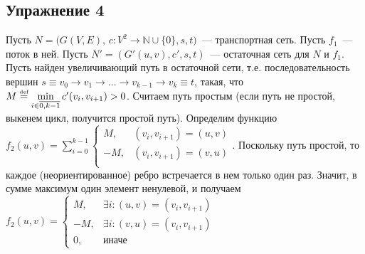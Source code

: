 \documentclass[a4paper]{article}
\def\eqdef{\overset{\mbox{\tiny def}}{=}}
\newcommand{\Nz}{\mathbb{N}\cup\{0\}}
\begin{document}
\subsection*{Упражнение 4}
Пусть $N=(G(V,E)$, $c\colon V^2\to\Nz, s, t)$~--- транспортная сеть. Пусть $f_1$~--- поток в ней. Пусть $N'=(G'(u,v), c',s,t)$~--- остаточная сеть для $N$ и $f_1$. Пусть найден увеличивающий путь в остаточной сети, т.е. последовательность вершин $s\equiv v_0\to v_1\to ...\to v_{k-1}\to v_k\equiv t$, такая, что
$M\eqdef \min\limits_{i\in\overline{0,k-1}}c'(v_i,v_{i+1})>0$. Считаем путь простым (если путь не простой, выкенем цикл, получится простой путь). Определим функцию $f_2(u,v)=\sum\limits_{i=0}^{k-1}\left\{\begin{array}{rc}
 M, & (v_i,v_{i+1})=(u,v)\\
-M, & (v_i,v_{i+1})=(v,u)\\
\end{array}\right.$. Поскольку путь простой, то каждое (неориентированное) ребро встречается в нем только один раз. Значит, в сумме максимум один элемент ненулевой, и получаем $f_2(u,v)=\left\{\begin{array}{rl}
M, & \exists i\colon (u,v)=(v_i,v_{i+1})\\
-M, & \exists i\colon (v,u)=(v_i,v_{i+1})\\
0, & \mbox{иначе}
\end{array}\right.$
\end{document}
